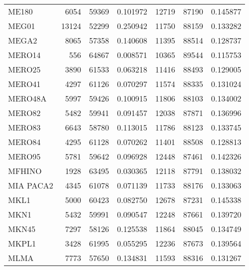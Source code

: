 \begin{tabular}{lrrrrrr}
                                ME180 &      6054 &    59369 &  0.101972 &     12719 &    87190 &  0.145877 \\
                                MEG01 &     13124 &    52299 &  0.250942 &     11750 &    88159 &  0.133282 \\
                                MEGA2 &      8065 &    57358 &  0.140608 &     11395 &    88514 &  0.128737 \\
                               MERO14 &       556 &    64867 &  0.008571 &     10365 &    89544 &  0.115753 \\
                               MERO25 &      3890 &    61533 &  0.063218 &     11416 &    88493 &  0.129005 \\
                               MERO41 &      4297 &    61126 &  0.070297 &     11574 &    88335 &  0.131024 \\
                              MERO48A &      5997 &    59426 &  0.100915 &     11806 &    88103 &  0.134002 \\
                               MERO82 &      5482 &    59941 &  0.091457 &     12038 &    87871 &  0.136996 \\
                               MERO83 &      6643 &    58780 &  0.113015 &     11786 &    88123 &  0.133745 \\
                               MERO84 &      4295 &    61128 &  0.070262 &     11401 &    88508 &  0.128813 \\
                               MERO95 &      5781 &    59642 &  0.096928 &     12448 &    87461 &  0.142326 \\
                               MFHINO &      1928 &    63495 &  0.030365 &     12118 &    87791 &  0.138032 \\
                            MIA PACA2 &      4345 &    61078 &  0.071139 &     11733 &    88176 &  0.133063 \\
                                 MKL1 &      5000 &    60423 &  0.082750 &     12678 &    87231 &  0.145338 \\
                                 MKN1 &      5432 &    59991 &  0.090547 &     12248 &    87661 &  0.139720 \\
                                MKN45 &      7297 &    58126 &  0.125538 &     11864 &    88045 &  0.134749 \\
                                MKPL1 &      3428 &    61995 &  0.055295 &     12236 &    87673 &  0.139564 \\
                                 MLMA &      7773 &    57650 &  0.134831 &     11593 &    88316 &  0.131267 \\

\end{tabular}

